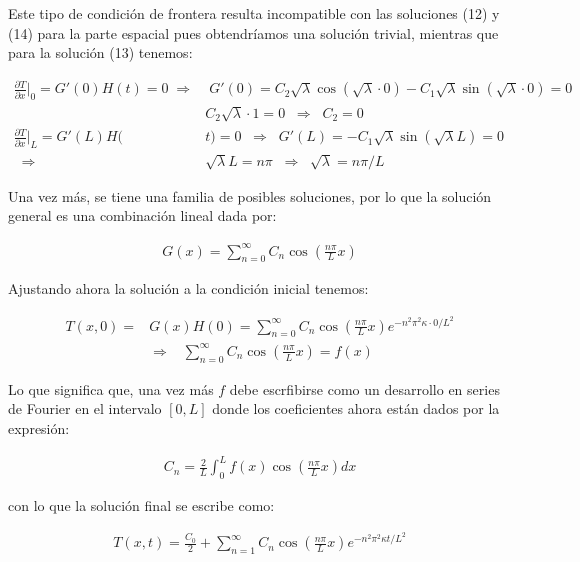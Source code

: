 \documentclass[12pt]{article}
\begin{document}
Este tipo de condición de frontera resulta incompatible con las soluciones (12) y (14) para la parte espacial pues obtendríamos una solución trivial, mientras que para la solución (13) tenemos:

\begin{align*}
    \frac{\partial T}{\partial x}\Big|_0 = G'(0)H(t) = 0 \; \Rightarrow& \; G'(0) = C_2\sqrt{\lambda}\cos(\sqrt{\lambda}\cdot 0) - C_1\sqrt{\lambda}\sin(\sqrt{\lambda}\cdot 0) = 0 \\
    &C_2\sqrt{\lambda}\cdot 1 = 0 \;\; \Rightarrow \;\; C_2 = 0 \\
    \frac{\partial T}{\partial x}\Big|_L = G'(L)H(&t) = 0 \;\; \Rightarrow \;\; G'(L) = - C_1\sqrt{\lambda}\sin(\sqrt{\lambda}L) = 0 \\
    \;\; \Rightarrow \;\; &\sqrt{\lambda}L = n\pi \;\; \Rightarrow \;\; \sqrt{\lambda} = n\pi/L
\end{align*}

Una vez más, se tiene una familia de posibles soluciones, por lo que la solución general es una combinación lineal dada por:

\begin{align*}
    G(x) = \sum_{n=0}^{\infty} C_n\cos\left(\frac{n\pi}{L}x\right)
\end{align*}

Ajustando ahora la solución a la condición inicial tenemos:

\begin{align*}
    T(x,0) = &G(x)H(0) = \sum_{n=0}^{\infty} C_n\cos\left(\frac{n\pi}{L}x\right) e^{-n^2\pi^2\kappa \cdot 0/L^2} \\
    &\Rightarrow \;\;\; \sum_{n=0}^{\infty} C_n\cos\left(\frac{n\pi}{L}x\right) = f(x)
\end{align*}

Lo que significa que, una vez más $f$ debe escrfibirse como un desarrollo en series de Fourier en el intervalo $[0,L]$ donde los coeficientes ahora están dados por la expresión:

\begin{align*}
    C_n = \frac{2}{L}\int_{0}^{L}f(x)\cos\left(\frac{n\pi}{L}x\right)dx
\end{align*}

con lo que la solución final se escribe como:

\begin{align}
    T(x,t) = \frac{C_0}{2} + \sum_{n=1}^{\infty} C_n\cos\left(\frac{n\pi}{L}x\right) e^{-n^2\pi^2\kappa t/L^2}
\end{align}
\end{document}
